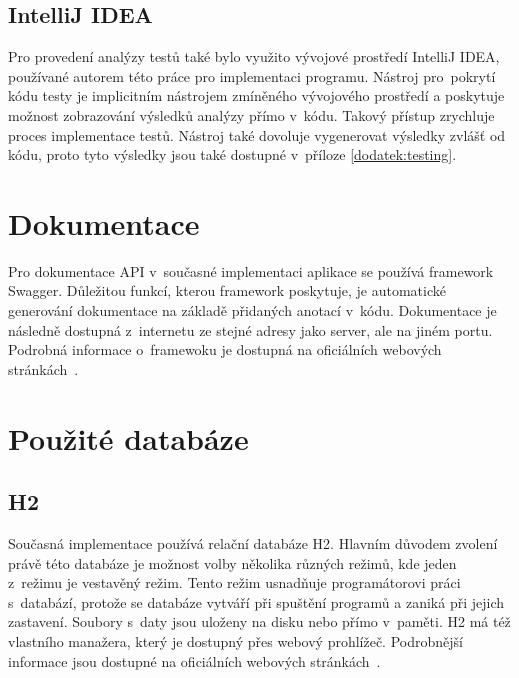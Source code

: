     \subsection{IntelliJ IDEA}\label{resere:testovani:intellij-idea}
        Pro provedení analýzy testů také bylo využito vývojové prostředí IntelliJ IDEA, používané autorem této práce pro implementaci programu. Nástroj pro~pokrytí kódu testy je implicitním nástrojem zmíněného vývojového prostředí a poskytuje možnost zobrazování výsledků analýzy přímo v~kódu. Takový přístup zrychluje proces implementace testů. Nástroj také dovoluje vygenerovat výsledky zvlášť od kódu, proto tyto výsledky jsou také dostupné v~příloze \ref{dodatek:testing}.


\section{Dokumentace}\label{resere:dokumentace}
    Pro dokumentace API v~současné implementaci aplikace se používá framework Swagger. Důležitou funkcí, kterou framework poskytuje, je automatické generování dokumentace na základě přidaných anotací v~kódu. Dokumentace je následně dostupná z~internetu ze stejné adresy jako server, ale na jiném portu. Podrobná informace o~framewoku je dostupná na oficiálních webových stránkách~\cite{swagger-doc}.
    
\section{Použité databáze}\label{resere:databaze}

    \subsection{H2}
        Současná implementace používá relační databáze H2. Hlavním důvodem zvolení právě této databáze je možnost volby několika různých režimů, kde jeden z~režimu je vestavěný režim. Tento režim usnadňuje programátorovi práci s~databází, protože se databáze vytváří při spuštění programů a zaniká při jejich zastavení. Soubory s~daty jsou uloženy na disku nebo přímo v~paměti. H2 má též vlastního manažera, který je dostupný přes webový prohlížeč. Podrobnější informace jsou dostupné na oficiálních webových stránkách~\cite{h2-doc}.
        
